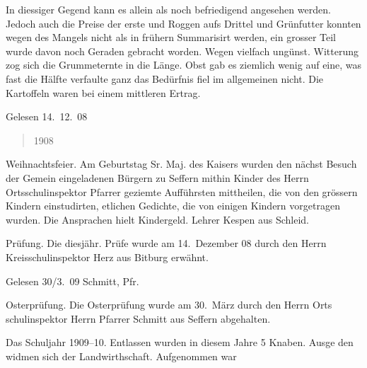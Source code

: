 

\pstart
In diessiger Gegend kann es allein als noch befriedigend angesehen\ob
werden. Jedoch auch die Preise der erste und Roggen aufs\ob
Drittel und Grünfutter konnten wegen des Mangels nicht als in\ob
frühern Summarisirt werden, ein grosser Teil wurde davon\ob
noch Geraden gebracht worden. Wegen vielfach ungünst.\ob
Witterung zog sich die Grummeternte in die Länge. Obst gab es\ob
ziemlich wenig auf eine, was fast die Hälfte verfaulte ganz das\ob
Bedürfnis fiel im allgemeinen nicht. Die Kartoffeln waren\ob
bei einem mittleren Ertrag.

Gelesen 14.\ 12.\ 08

\pend
\begin{verse}
1908
\end{verse}
\pstart

Weihnachtsfeier.\ob
Am Geburtstag Sr. Maj. des Kaisers wurden den\ob
nächst Besuch der Gemein eingeladenen Bürgern zu\ob
Seffern mithin Kinder des Herrn Ortsschulinspektor Pfarrer\ob
geziemte Aufführsten mittheilen, die von den grössern\ob
Kindern einstudirten, etlichen Gedichte, die von einigen\ob
Kindern vorgetragen wurden. Die Ansprachen hielt\ob
Kindergeld. Lehrer Kespen aus Schleid.

Prüfung.\ob
Die diesjähr. Prüfe wurde am 14.\ Dezember 08 durch\ob
den Herrn Kreisschulinspektor Herz aus Bitburg erwähnt.

Gelesen 30/3.\ 09
Schmitt, Pfr.

Osterprüfung.\ob
Die Osterprüfung wurde am 30.\ März durch den Herrn Orts\ohb
schulinspektor Herrn Pfarrer Schmitt aus Seffern abgehalten.

Das Schuljahr 1909--10.\ob
Entlassen wurden in diesem Jahre 5 Knaben. Ausge\ohb
den widmen sich der Landwirthschaft. Aufgenommen war
\pend
